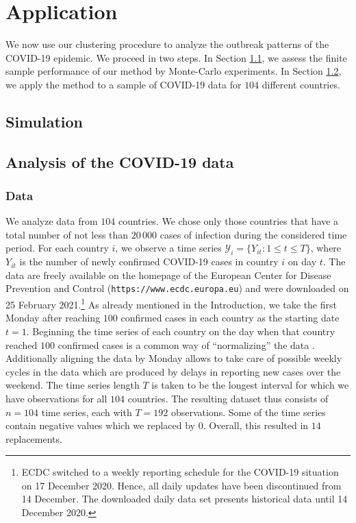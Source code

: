 \documentclass[a4paper,11pt]{article}
\numberwithin{equation}{section}
\begin{document}
\section{Application}\label{sec:app}

We now use our clustering procedure to analyze the outbreak patterns of the COVID-19 epidemic. We proceed in two steps. In Section \ref{subsec:sim}, we assess the finite sample performance of our method by Monte-Carlo experiments. In Section \ref{subsec:app}, we apply the method to a sample of COVID-19 data for $104$ different countries.

\subsection{Simulation}\label{subsec:sim}

\subsection{Analysis of the COVID-19 data}\label{subsec:app}

\subsubsection{Data}


We analyze data from $104$ countries. We chose only those countries that have a total number of not less than $20\,000$ cases of infection during the considered time period. For each country $i$, we observe a time series $\mathcal{Y}_i = \{ Y_{it}: 1 \le t \le T \}$, where $Y_{it}$ is the number of newly confirmed COVID-19 cases in country $i$ on day $t$. The data are freely available on the homepage of the European Center for Disease Prevention and Control (\texttt{https://www.ecdc.europa.eu}) and were downloaded on 25 February 2021.\footnote{ECDC switched to a weekly reporting schedule for the COVID-19 situation on 17 December 2020. Hence, all daily updates have been discontinued from 14 December. The downloaded daily data set presents historical data until 14 December 2020.} As already mentioned in the Introduction, we take the first Monday after reaching $100$ confirmed cases in each country as the starting date $t=1$. Beginning the time series of each country on the day when that country reached $100$ confirmed cases is a common way of ``normalizing'' the data \citep[see e.g.][]{Cohen2020}. Additionally aligning the data by Monday allows to take care of possible weekly cycles in the data which are produced by delays in reporting new cases over the weekend. The time series length $T$ is taken to be the longest interval for which we have observations for all $104$ countries. The resulting dataset thus consists of $n = 104$ time series, each with $T = 192$ observations. Some of the time series contain negative values which we replaced by $0$. Overall, this resulted in $14$ replacements.
\end{document}
